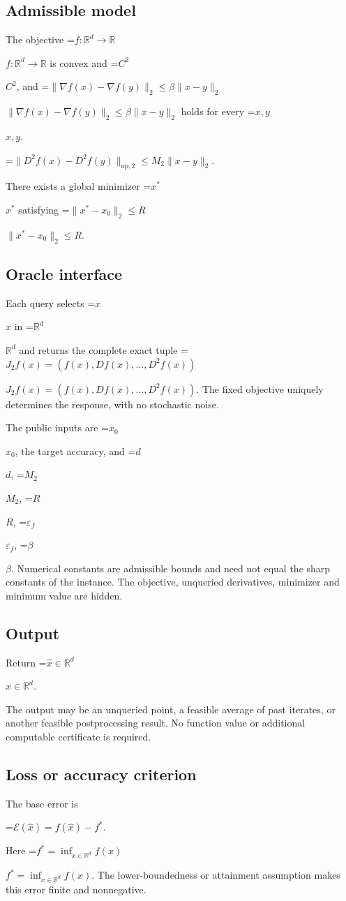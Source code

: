 \documentclass[10pt,a4paper]{article}
\newcommand{\AtlasMath}[1]{\par\begingroup\centering\setbox0=\hbox{$\displaystyle #1$}\ifdim\wd0>1.4\linewidth\typeout{ATLAS WIDE FORMULA: \the\wd0}\fi\ifdim\wd0>\linewidth\resizebox{\linewidth}{!}{\box0}\else\box0\fi\par\endgroup}
\newcommand{\AtlasInlineMath}[1]{\begingroup\setbox0=\hbox{$#1$}\ifdim\wd0>.4\linewidth\endgroup\AtlasMath{#1}\else\endgroup$#1$\fi}
\begin{document}
\subsection{Admissible model}
The objective \AtlasInlineMath{f:\mathbb{R}^d\to\mathbb{R}} is convex and \AtlasInlineMath{C^2}, and \AtlasInlineMath{\|\nabla f(x)-\nabla f(y)\|_2\le\beta\|x-y\|_2} holds for every \AtlasInlineMath{x,y}.


\AtlasMath{\|D^{2}f(x)-D^{2}f(y)\|_{\mathrm{op},2}\le M_2\|x-y\|_{2}.}


There exists a global minimizer \AtlasInlineMath{x^*} satisfying \AtlasInlineMath{\|x^*-x_0\|_2\le R}.

\subsection{Oracle interface}
Each query selects \AtlasInlineMath{x} in \AtlasInlineMath{\mathbb{R}^d} and returns the complete exact tuple \AtlasInlineMath{J_{2}f(x)=(f(x),Df(x),\ldots,D^{2}f(x))}. The fixed objective uniquely determines the response, with no stochastic noise.

The public inputs are \AtlasInlineMath{x_0}, the target accuracy, and \AtlasInlineMath{d}, \AtlasInlineMath{M_2}, \AtlasInlineMath{R}, \AtlasInlineMath{\varepsilon_f}, \AtlasInlineMath{\beta}. Numerical constants are admissible bounds and need not equal the sharp constants of the instance. The objective, unqueried derivatives, minimizer and minimum value are hidden.

\subsection{Output}
Return \AtlasInlineMath{\widehat{x}\in \mathbb{R}^d}.

The output may be an unqueried point, a feasible average of past iterates, or another feasible postprocessing result. No function value or additional computable certificate is required.

\subsection{Loss or accuracy criterion}
The base error is


\AtlasMath{\mathcal{E}(\widehat{x})=f(\widehat{x})-f^*.}


Here \AtlasInlineMath{f^*=\inf_{x\in \mathbb{R}^d}f(x)}. The lower-boundedness or attainment assumption makes this error finite and nonnegative.
\end{document}
